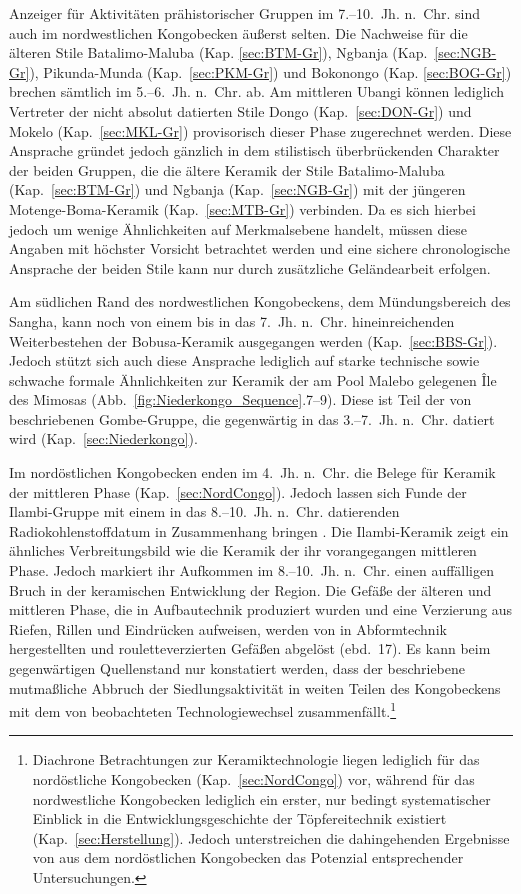 Anzeiger für Aktivitäten prähistorischer Gruppen im 7.--10.~Jh. n.~Chr. sind auch im nordwestlichen Kongobecken äußerst selten. Die Nachweise für die älteren Stile Batalimo-Maluba (Kap. \ref{sec:BTM-Gr}), \mbox{Ngbanja} (Kap.~\ref{sec:NGB-Gr}), Pikunda-Munda (Kap.~\ref{sec:PKM-Gr}) und Bokonongo (Kap. \ref{sec:BOG-Gr}) brechen sämtlich im \mbox{5.--6.~Jh.} n.~Chr. ab. Am mittleren \mbox{Ubangi} können lediglich Vertreter der nicht absolut datierten Stile Dongo (Kap.~\ref{sec:DON-Gr}) und Mokelo (Kap.~\ref{sec:MKL-Gr}) provisorisch dieser Phase zugerechnet werden. Diese Ansprache gründet jedoch gänzlich in dem stilistisch überbrückenden Charakter der beiden Gruppen, die die ältere Keramik der Stile Batalimo-Maluba (Kap.~\ref{sec:BTM-Gr}) und \mbox{Ngbanja} (Kap.~\ref{sec:NGB-Gr}) mit der jüngeren Motenge-Boma-Keramik (Kap.~\ref{sec:MTB-Gr}) verbinden. Da es sich hierbei jedoch um wenige Ähnlichkeiten auf Merkmalsebene handelt, müssen diese Angaben mit höchster Vorsicht betrachtet werden und eine sichere chronologische Ansprache der beiden Stile kann nur durch zusätzliche Geländearbeit erfolgen.

Am südlichen Rand des nordwestlichen Kongobeckens, dem Mündungsbereich des \mbox{Sangha}, kann noch von einem bis in das 7.~Jh. n.~Chr. hineinreichenden Weiterbestehen der Bobusa-Keramik ausgegangen werden (Kap.~\ref{sec:BBS-Gr}). Jedoch stützt sich auch diese Ansprache lediglich auf starke technische sowie schwache formale Ähnlichkeiten zur Keramik der am Pool Malebo gelegenen Île des Mimosas (Abb.~\ref{fig:Niederkongo_Sequence}.7--9). Diese ist Teil der von \textcites{deMaret.1986}{Maret.1990} beschriebenen Gombe-Gruppe, die gegenwärtig in das 3.--7.~Jh. n.~Chr. datiert wird (Kap.~\ref{sec:Niederkongo}).

Im nordöstlichen Kongobecken enden im 4.~Jh. n.~Chr. die Belege für Keramik der mittleren Phase (Kap.~\ref{sec:NordCongo}). Jedoch lassen sich Funde der Ilambi-Gruppe mit einem in das 8.--10.~Jh. n.~Chr. datierenden Radiokohlenstoffdatum in Zusammenhang bringen \parencite[4 Tab.~1: Poz-75462]{LivingstoneSmith.2017}. Die Ilambi-Keramik zeigt ein ähnliches Verbreitungsbild wie die Keramik der ihr vorangegangen mittleren Phase. Jedoch markiert ihr Aufkommen im 8.--10.~Jh. n.~Chr. einen auffälligen Bruch in der keramischen Entwicklung der Region. Die Gefäße der älteren und mittleren Phase, die in Aufbautechnik produziert wurden und eine Verzierung aus Riefen, Rillen und Eindrücken aufweisen, werden von in Abformtechnik hergestellten und rouletteverzierten Gefäßen abgelöst (ebd.~17). Es kann beim gegenwärtigen Quellenstand nur konstatiert werden, dass der beschriebene mutmaßliche Abbruch der Siedlungsaktivität in weiten Teilen des Kongobeckens mit dem von \textcite{LivingstoneSmith.2017} beobachteten Technologiewechsel zusammenfällt.\footnote{Diachrone Betrachtungen zur Keramiktechnologie liegen lediglich für das nordöstliche Kongobecken (Kap.~\ref{sec:NordCongo}) vor, während für das nordwestliche Kongobecken lediglich ein erster, nur bedingt systematischer Einblick in die Entwicklungsgeschichte der Töpfereitechnik existiert (Kap.~\ref{sec:Herstellung}). Jedoch unterstreichen die dahingehenden Ergebnisse von \textcite{LivingstoneSmith.2017} aus dem nordöstlichen Kongobecken das Potenzial entsprechender Untersuchungen.}

